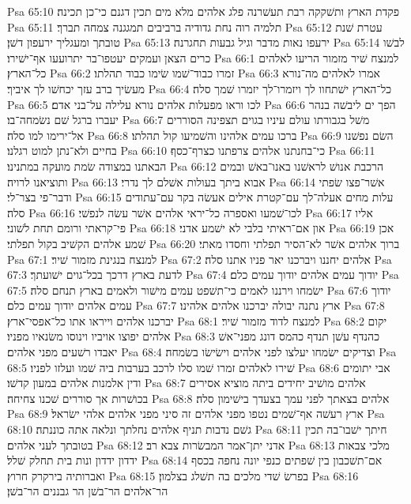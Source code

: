 Psa 65:10  פקדת הארץ ותשׁקקה רבת תעשׁרנה פלג אלהים מלא מים תכין דגנם כי־כן תכינה׃
Psa 65:11  תלמיה רוה נחת גדודיה ברביבים תמגגנה צמחה תברך׃
Psa 65:12  עטרת שׁנת טובתך ומעגליך ירעפון דשׁן׃
Psa 65:13  ירעפו נאות מדבר וגיל גבעות תחגרנה׃
Psa 65:14  לבשׁו כרים הצאן ועמקים יעטפו־בר יתרועעו אף־ישׁירו׃
Psa 66:1  למנצח שׁיר מזמור הריעו לאלהים כל־הארץ׃
Psa 66:2  זמרו כבוד־שׁמו שׂימו כבוד תהלתו׃
Psa 66:3  אמרו לאלהים מה־נורא מעשׂיך ברב עזך יכחשׁו לך איביך׃
Psa 66:4  כל־הארץ ישׁתחוו לך ויזמרו־לך יזמרו שׁמך סלה׃
Psa 66:5  לכו וראו מפעלות אלהים נורא עלילה על־בני אדם׃
Psa 66:6  הפך ים ליבשׁה בנהר יעברו ברגל שׁם נשׂמחה־בו׃
Psa 66:7  משׁל בגבורתו עולם עיניו בגוים תצפינה הסוררים אל־ירימו למו סלה׃
Psa 66:8  ברכו עמים אלהינו והשׁמיעו קול תהלתו׃
Psa 66:9  השׂם נפשׁנו בחיים ולא־נתן למוט רגלנו׃
Psa 66:10  כי־בחנתנו אלהים צרפתנו כצרף־כסף׃
Psa 66:11  הבאתנו במצודה שׂמת מועקה במתנינו׃
Psa 66:12  הרכבת אנושׁ לראשׁנו באנו־באשׁ ובמים ותוציאנו לרויה׃
Psa 66:13  אבוא ביתך בעולות אשׁלם לך נדרי׃
Psa 66:14  אשׁר־פצו שׂפתי ודבר־פי בצר־לי׃
Psa 66:15  עלות מחים אעלה־לך עם־קטרת אילים אעשׂה בקר עם־עתודים סלה׃
Psa 66:16  לכו־שׁמעו ואספרה כל־יראי אלהים אשׁר עשׂה לנפשׁי׃
Psa 66:17  אליו פי־קראתי ורומם תחת לשׁוני׃
Psa 66:18  און אם־ראיתי בלבי לא ישׁמע אדני׃
Psa 66:19  אכן שׁמע אלהים הקשׁיב בקול תפלתי׃
Psa 66:20  ברוך אלהים אשׁר לא־הסיר תפלתי וחסדו מאתי׃
Psa 67:1  למנצח בנגינת מזמור שׁיר׃
Psa 67:2  אלהים יחננו ויברכנו יאר פניו אתנו סלה׃
Psa 67:3  לדעת בארץ דרכך בכל־גוים ישׁועתך׃
Psa 67:4  יודוך עמים אלהים יודוך עמים כלם׃
Psa 67:5  ישׂמחו וירננו לאמים כי־תשׁפט עמים מישׁור ולאמים בארץ תנחם סלה׃
Psa 67:6  יודוך עמים אלהים יודוך עמים כלם׃
Psa 67:7  ארץ נתנה יבולה יברכנו אלהים אלהינו׃
Psa 67:8  יברכנו אלהים וייראו אתו כל־אפסי־ארץ׃
Psa 68:1  למנצח לדוד מזמור שׁיר׃
Psa 68:2  יקום אלהים יפוצו אויביו וינוסו משׂנאיו מפניו׃
Psa 68:3  כהנדף עשׁן תנדף כהמס דונג מפני־אשׁ יאבדו רשׁעים מפני אלהים׃
Psa 68:4  וצדיקים ישׂמחו יעלצו לפני אלהים וישׂישׂו בשׂמחה׃
Psa 68:5  שׁירו לאלהים זמרו שׁמו סלו לרכב בערבות ביה שׁמו ועלזו לפניו׃
Psa 68:6  אבי יתומים ודין אלמנות אלהים במעון קדשׁו׃
Psa 68:7  אלהים מושׁיב יחידים ביתה מוציא אסירים בכושׁרות אך סוררים שׁכנו צחיחה׃
Psa 68:8  אלהים בצאתך לפני עמך בצעדך בישׁימון סלה׃
Psa 68:9  ארץ רעשׁה אף־שׁמים נטפו מפני אלהים זה סיני מפני אלהים אלהי ישׂראל׃
Psa 68:10  גשׁם נדבות תניף אלהים נחלתך ונלאה אתה כוננתה׃
Psa 68:11  חיתך ישׁבו־בה תכין בטובתך לעני אלהים׃
Psa 68:12  אדני יתן־אמר המבשׂרות צבא רב׃
Psa 68:13  מלכי צבאות ידדון ידדון ונות בית תחלק שׁלל׃
Psa 68:14  אם־תשׁכבון בין שׁפתים כנפי יונה נחפה בכסף ואברותיה בירקרק חרוץ׃
Psa 68:15  בפרשׂ שׁדי מלכים בה תשׁלג בצלמון׃
Psa 68:16  הר־אלהים הר־בשׁן הר גבננים הר־בשׁן׃
